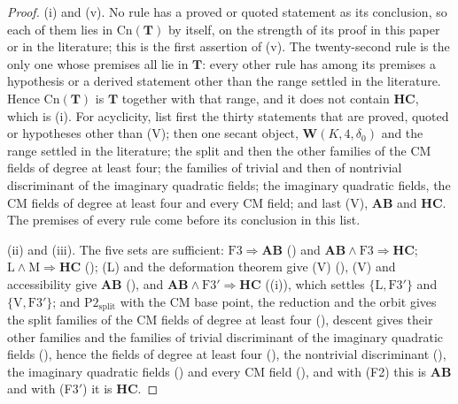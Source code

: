 \documentclass[11pt,reqno]{amsart}
\theoremstyle{plain}
\theoremstyle{definition}
\theoremstyle{remark}
\newcommand{\Cn}{\mathrm{Cn}}
\begin{document}
\begin{proof}
(i) and (v). No rule has a proved or quoted statement as its conclusion, so
each of them lies in $\Cn(\mathbf{T})$ by itself, on the strength of its proof
in this paper or in the literature; this is the first assertion of (v). The
twenty-second rule is the only one whose premises all lie in $\mathbf{T}$:
every other rule has among its premises a hypothesis or a derived statement
other than the range settled in the literature. Hence $\Cn(\mathbf{T})$ is
$\mathbf{T}$ together with that range, and it does not contain $\mathbf{HC}$,
which is (i). For acyclicity, list first the thirty statements that are
proved, quoted or hypotheses other than (V); then one secant object,
$\mathbf{W}(K,4,\delta_{0})$ and the range settled in the literature; the
split and then the other families of the CM fields of degree at least four;
the families of trivial and then of nontrivial discriminant of the imaginary
quadratic fields; the imaginary quadratic fields, the CM fields of degree at
least four and every CM field; and last (V), $\mathbf{AB}$ and $\mathbf{HC}$.
The premises of every rule come before its conclusion in this list.

(ii) and (iii). The five sets are sufficient:
$\mathrm{F3}\Rightarrow\mathbf{AB}$ () and
$\mathbf{AB}\wedge\mathrm{F3}\Rightarrow\mathbf{HC}$; $\mathrm{L}\wedge
\mathrm{M}\Rightarrow\mathbf{HC}$ (); (L) and the
deformation theorem give (V) (), (V) and accessibility give
$\mathbf{AB}$ (), and $\mathbf{AB}\wedge\mathrm{F3}'
\Rightarrow\mathbf{HC}$ ((i)), which settles
$\{\mathrm{L},\mathrm{F3}'\}$ and $\{\mathrm{V},\mathrm{F3}'\}$; and
$\mathrm{P2}_{\mathrm{split}}$ with the CM base point, the reduction and the
orbit gives the split families of the CM fields of degree at least four
(\cite[Theorem~17.7]{paperI}), descent gives their other families and the
families of trivial discriminant of the imaginary quadratic fields
(), hence the fields of degree at least four
(\cite[Proposition~17.3]{paperI}), the nontrivial discriminant (),
the imaginary quadratic fields () and every CM field
(\cite[Appendix~C]{paperI}), and with (F2) this is $\mathbf{AB}$ and with (F3$'$)
it is $\mathbf{HC}$.


\end{proof}
\end{document}

